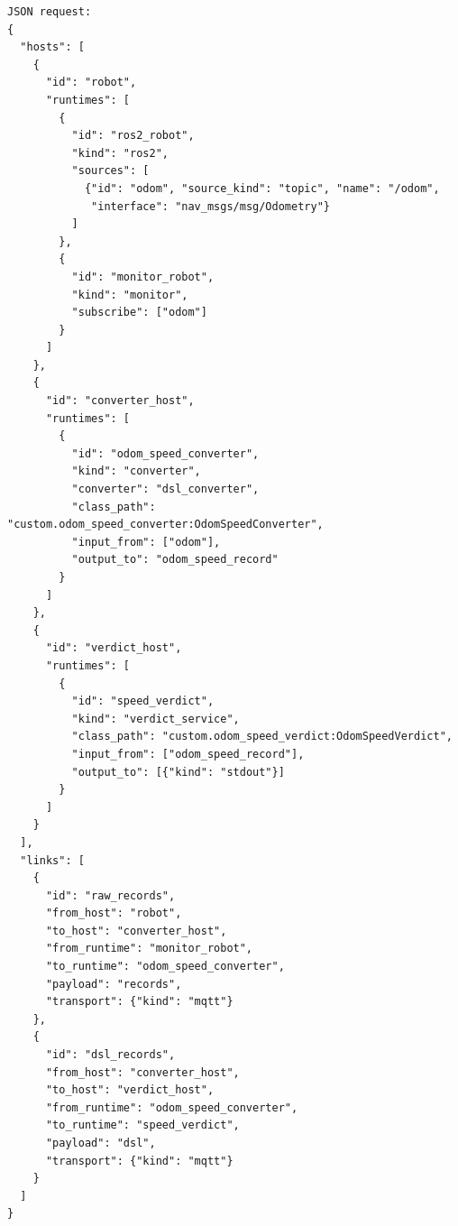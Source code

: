 \documentclass[11pt]{article}
\begin{document}
\begin{verbatim}
JSON request:
{
  "hosts": [
    {
      "id": "robot",
      "runtimes": [
        {
          "id": "ros2_robot",
          "kind": "ros2",
          "sources": [
            {"id": "odom", "source_kind": "topic", "name": "/odom",
             "interface": "nav_msgs/msg/Odometry"}
          ]
        },
        {
          "id": "monitor_robot",
          "kind": "monitor",
          "subscribe": ["odom"]
        }
      ]
    },
    {
      "id": "converter_host",
      "runtimes": [
        {
          "id": "odom_speed_converter",
          "kind": "converter",
          "converter": "dsl_converter",
          "class_path": "custom.odom_speed_converter:OdomSpeedConverter",
          "input_from": ["odom"],
          "output_to": "odom_speed_record"
        }
      ]
    },
    {
      "id": "verdict_host",
      "runtimes": [
        {
          "id": "speed_verdict",
          "kind": "verdict_service",
          "class_path": "custom.odom_speed_verdict:OdomSpeedVerdict",
          "input_from": ["odom_speed_record"],
          "output_to": [{"kind": "stdout"}]
        }
      ]
    }
  ],
  "links": [
    {
      "id": "raw_records",
      "from_host": "robot",
      "to_host": "converter_host",
      "from_runtime": "monitor_robot",
      "to_runtime": "odom_speed_converter",
      "payload": "records",
      "transport": {"kind": "mqtt"}
    },
    {
      "id": "dsl_records",
      "from_host": "converter_host",
      "to_host": "verdict_host",
      "from_runtime": "odom_speed_converter",
      "to_runtime": "speed_verdict",
      "payload": "dsl",
      "transport": {"kind": "mqtt"}
    }
  ]
}
\end{verbatim}
\end{document}
